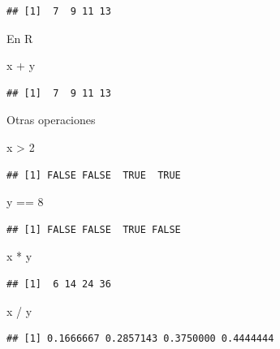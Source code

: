 \documentclass[
  12pt,
]{book}
\newenvironment{Shaded}{\begin{snugshade}}{\end{snugshade}}
\newcommand{\DecValTok}[1]{\textcolor[rgb]{0.00,0.00,0.81}{#1}}
\newcommand{\NormalTok}[1]{#1}
\newcommand{\SpecialCharTok}[1]{\textcolor[rgb]{0.00,0.00,0.00}{#1}}
\begin{document}
\begin{verbatim}
## [1]  7  9 11 13
\end{verbatim}

En R

\begin{Shaded}
\begin{Highlighting}[]
\NormalTok{x }\SpecialCharTok{+}\NormalTok{ y}
\end{Highlighting}
\end{Shaded}

\begin{verbatim}
## [1]  7  9 11 13
\end{verbatim}

Otras operaciones

\begin{Shaded}
\begin{Highlighting}[]
\NormalTok{x }\SpecialCharTok{\textgreater{}} \DecValTok{2}
\end{Highlighting}
\end{Shaded}

\begin{verbatim}
## [1] FALSE FALSE  TRUE  TRUE
\end{verbatim}

\begin{Shaded}
\begin{Highlighting}[]
\NormalTok{y }\SpecialCharTok{==} \DecValTok{8}
\end{Highlighting}
\end{Shaded}

\begin{verbatim}
## [1] FALSE FALSE  TRUE FALSE
\end{verbatim}

\begin{Shaded}
\begin{Highlighting}[]
\NormalTok{x }\SpecialCharTok{*}\NormalTok{ y}
\end{Highlighting}
\end{Shaded}

\begin{verbatim}
## [1]  6 14 24 36
\end{verbatim}

\begin{Shaded}
\begin{Highlighting}[]
\NormalTok{x }\SpecialCharTok{/}\NormalTok{ y}
\end{Highlighting}
\end{Shaded}

\begin{verbatim}
## [1] 0.1666667 0.2857143 0.3750000 0.4444444
\end{verbatim}
\end{document}
